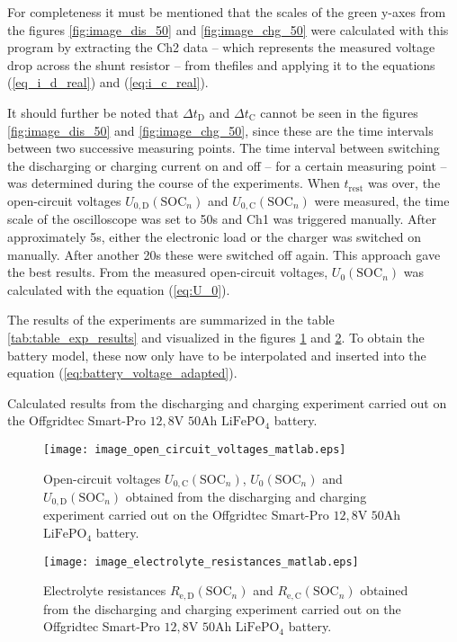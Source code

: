 For completeness it must be mentioned that the scales of the green y-axes from the figures \ref{fig:image_dis_50} and \ref{fig:image_chg_50} were calculated with this \MATLAB program by extracting the Ch2 data -- which represents the measured voltage drop across the shunt resistor -- from thefiles and applying it to the equations (\ref{eq_i_d_real}) and (\ref{eq:i_c_real}).

It should further be noted that $\Delta t_\mathrm{D}$ and $\Delta t_\mathrm{C}$ cannot be seen in the figures \ref{fig:image_dis_50} and \ref{fig:image_chg_50}, since these are the time intervals between two successive measuring points. The time interval between switching the discharging or charging current on and off -- for a certain measuring point -- was determined during the course of the experiments. When $t_\mathrm{rest}$ was over, the open-circuit voltages $U_\mathrm{0,D}(\mathrm{SOC}_n)$ and $U_\mathrm{0,C}(\mathrm{SOC}_n)$ were measured, the time scale of the oscilloscope was set to 50s and Ch1 was triggered manually. After approximately 5s, either the electronic load or the charger was switched on manually. After another 20s these were switched off again. This approach gave the best results. From the measured open-circuit voltages, $U_\mathrm{0}(\mathrm{SOC}_n)$ was calculated with the equation (\ref{eq:U_0}).

The results of the experiments are summarized in the table \ref{tab:table_exp_results} and visualized in the figures \ref{fig:image_open_circuit_voltages_matlab} and \ref{fig:image_electrolyte_resistances_matlab}. To obtain the battery model, these now only have to be interpolated and inserted into the equation (\ref{eq:battery_voltage_adapted}). 
\begin{table}[h!]
	\centering
	
	\caption{Calculated results from the discharging and charging experiment carried out on the Offgridtec Smart-Pro $12,8\mathrm{V}$ $50\mathrm{Ah}$ $\mathrm{LiFePO_4}$ battery.}
	\label{tab:table_exp_results}
\end{table}
\begin{figure}[h!]
	\centering
  	\texttt{[image: image\_open\_circuit\_voltages\_matlab.eps]}
  	\caption{Open-circuit voltages $U_\mathrm{0,C}(\mathrm{SOC}_n)$, $U_\mathrm{0}(\mathrm{SOC}_n)$ and $U_\mathrm{0,D}(\mathrm{SOC}_n)$ obtained from the discharging and charging experiment carried out on the Offgridtec Smart-Pro $12,8\mathrm{V}$ $50\mathrm{Ah}$ $\mathrm{LiFePO_4}$ battery.}
	\label{fig:image_open_circuit_voltages_matlab}
\end{figure}
\begin{figure}[h!]
	\centering
  	\texttt{[image: image\_electrolyte\_resistances\_matlab.eps]}
  	\caption{Electrolyte resistances $R_\mathrm{e,D}(\mathrm{SOC}_n)$ and $R_\mathrm{e,C}(\mathrm{SOC}_n)$ obtained from the discharging and charging experiment carried out on the Offgridtec Smart-Pro $12,8\mathrm{V}$ $50\mathrm{Ah}$ $\mathrm{LiFePO_4}$ battery.}
	\label{fig:image_electrolyte_resistances_matlab}
\end{figure}

